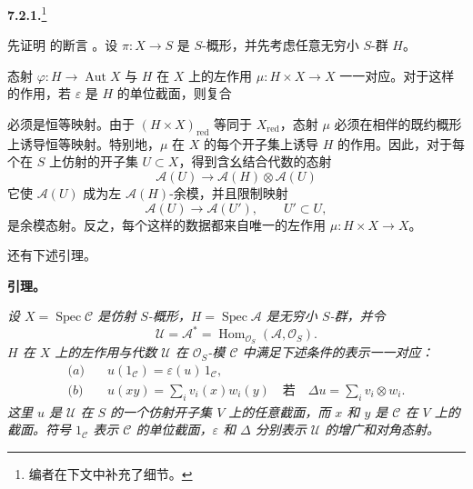 \medskip
\noindent\textbf{7.2.1.}\footnote{编者在下文中补充了细节。}
\label{sga3:VIIA:7.2.1}

先证明  的断言 。设 \(\pi:X\to S\) 是 \(S\)-概形，并先考虑任意无穷小 \(S\)-群 \(H\)。

态射 \(\varphi:H\to\operatorname{Aut}X\) 与 \(H\) 在 \(X\) 上的左作用 \(\mu:H\times X\to X\) 一一对应。对于这样的作用，若 \(\varepsilon\) 是 \(H\) 的单位截面，则复合
\begin{center}
  \label{sga3:VIIA:7.2.1-action-unit-composite}
  
\end{center}
必须是恒等映射。由于 \((H\times X)_{\mathrm{red}}\) 等同于 \(X_{\mathrm{red}}\)，态射 \(\mu\) 必须在相伴的既约概形上诱导恒等映射。特别地，\(\mu\) 在 \(X\) 的每个开子集上诱导 \(H\) 的作用。因此，对于每个在 \(S\) 上仿射的开子集 \(U\subset X\)，得到含幺结合代数的态射
\[
  \mathcal A(U)
  \longrightarrow
  \mathcal A(H)\otimes\mathcal A(U)
\]
它使 \(\mathcal A(U)\) 成为左 \(\mathcal A(H)\)-余模，并且限制映射
\[
  \mathcal A(U)\longrightarrow\mathcal A(U'),
  \qquad U'\subset U,
\]
是余模态射。反之，每个这样的数据都来自唯一的左作用 \(\mu:H\times X\to X\)。

还有下述引理。

\medskip
\noindent\textbf{引理。}
\label{sga3:VIIA:7.2.1-action-representation-lemma}

\textit{设 \(X=\operatorname{Spec}\mathcal C\) 是仿射 \(S\)-概形，\(H=\operatorname{Spec}\mathcal A\) 是无穷小 \(S\)-群，并令
\[
  \mathcal U
  =
  \mathcal A^{*}
  =
  \operatorname{Hom}_{\mathcal O_S}
    (\mathcal A,\mathcal O_S).
\]
\(H\) 在 \(X\) 上的左作用与代数 \(\mathcal U\) 在 \(\mathcal O_S\)-模 \(\mathcal C\) 中满足下述条件的表示一一对应：}
\begin{align*}
  \textit{(a)}\quad&
  u(1_{\mathcal C})
  =
  \varepsilon(u)\,1_{\mathcal C},
  \\
  \textit{(b)}\quad&
  u(xy)
  =
  \sum_i v_i(x)w_i(y)
  \quad\textit{若}\quad
  \Delta u
  =
  \sum_i v_i\otimes w_i.
\end{align*}
\textit{这里 \(u\) 是 \(\mathcal U\) 在 \(S\) 的一个仿射开子集 \(V\) 上的任意截面，而 \(x\) 和 \(y\) 是 \(\mathcal C\) 在 \(V\) 上的截面。符号 \(1_{\mathcal C}\) 表示 \(\mathcal C\) 的单位截面，\(\varepsilon\) 和 \(\Delta\) 分别表示 \(\mathcal U\) 的增广和对角态射。}

